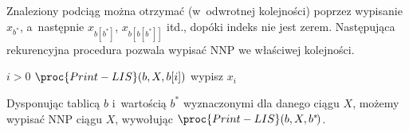 Znaleziony podciąg można otrzymać (w~odwrotnej kolejności) poprzez wypisanie $x_{b^*\!}$, a~następnie $x_{b[b^*\!]}$, $x_{b[b[b^*\!]]}$ itd., dopóki indeks nie jest zerem.
Następująca rekurencyjna procedura pozwala wypisać NNP we właściwej kolejności.
\begin{codebox}
\li	\If $i>0$
\li		\Then $\proc{Print-LIS}(b,X,b[i])$
\li			wypisz $x_i$
		\End
\end{codebox}
Dysponując tablicą $b$ i~wartością $b^*\!$ wyznaczonymi dla danego ciągu $X$, możemy wypisać NNP ciągu $X$, wywołując $\proc{Print-LIS}(b,X,b^*\!)$.

\exercise %

